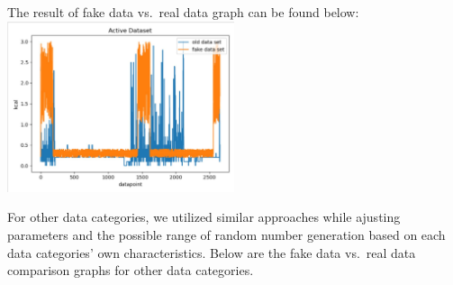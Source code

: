 \documentclass[]{book}
\begin{document}
The result of fake data vs.~real data graph can be found below:\\
\includegraphics[width=0.50000\textwidth]{./images/Active Data.JPG}

For other data categories, we utilized similar approaches while ajusting
parameters and the possible range of random number generation based on
each data categories' own characteristics. Below are the fake data
vs.~real data comparison graphs for other data categories.
\end{document}
